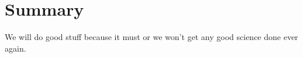 \section*{Summary}

We will do good stuff because it must or we won't get any good science done ever
again.

